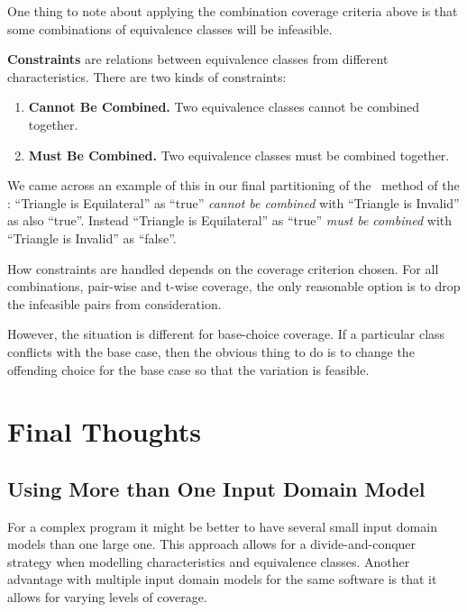 One thing to note about applying the combination coverage criteria above is that
some combinations of equivalence classes will be infeasible. 

{\bf Constraints} are relations between equivalence classes from different
characteristics. There are two kinds of constraints:

\begin{enumerate}

    \item {\bf Cannot Be Combined.} Two equivalence classes cannot be combined
    together. 
   
    \item {\bf Must Be Combined.} Two equivalence classes must be combined
    together.

\end{enumerate}

We came across an example of this in our final partitioning of the
\classifymethod~method of the \triangleclass: ``Triangle is Equilateral'' as
``true'' {\it cannot be combined} with ``Triangle is Invalid'' as also ``true''.
Instead ``Triangle is Equilateral'' as ``true'' {\it must be combined} with
``Triangle is Invalid'' as ``false''.

How constraints are handled depends on the coverage criterion chosen. For all
combinations, pair-wise and t-wise coverage, the only reasonable option is to
drop the infeasible pairs from consideration. 

However, the situation is different for base-choice coverage. If a particular
class conflicts with the base case, then the obvious thing to do is to change
the offending choice for the base case so that the variation is feasible. 

\section{Final Thoughts}

\subsection{Using More than One Input Domain Model}


For a complex program it might be better to have several small input domain
models than one large one. This approach allows for a divide-and-conquer
strategy when modelling characteristics and equivalence classes. Another
advantage with multiple input domain models for the same software is that it
allows for varying levels of coverage.

